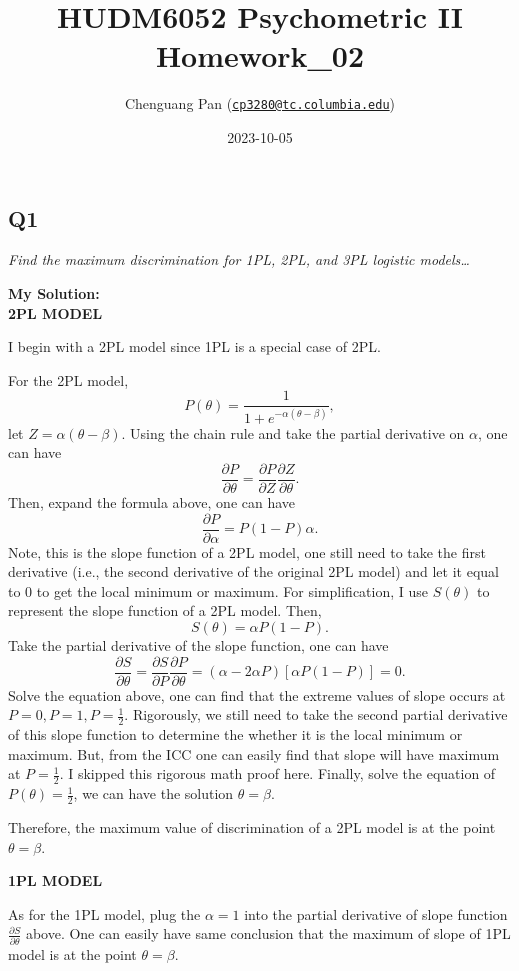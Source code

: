\documentclass[
]{article}
\title{HUDM6052 Psychometric II Homework\_02}
\author{Chenguang Pan
(\href{mailto:cp3280@tc.columbia.edu}{\nolinkurl{cp3280@tc.columbia.edu}})}
\date{2023-10-05}
\begin{document}
\maketitle

\setcounter{tocdepth}{4}
\tableofcontents

\hypertarget{q1}{%
\subsection{Q1}\label{q1}}

\emph{Find the maximum discrimination for 1PL, 2PL, and 3PL logistic
models\ldots{}}

\textbf{My Solution:}\\
\textbf{2PL MODEL}

I begin with a 2PL model since 1PL is a special case of 2PL.

For the 2PL model, \[P(\theta)=\frac{1}{1+e^{-\alpha(\theta-\beta)}},\]
let \(Z = \alpha(\theta-\beta)\). Using the chain rule and take the
partial derivative on \(\alpha\), one can have
\[\frac{\partial P}{\partial \theta}=\frac{\partial P}{\partial Z}\frac{\partial Z}{\partial \theta}. \]
Then, expand the formula above, one can have
\[\frac{\partial P}{\partial \alpha}=P(1-P)\alpha.\] Note, this is the
slope function of a 2PL model, one still need to take the first
derivative (i.e., the second derivative of the original 2PL model) and
let it equal to 0 to get the local minimum or maximum. For
simplification, I use \(S(\theta)\) to represent the slope function of a
2PL model. Then, \[S(\theta) = \alpha P(1-P).\] Take the partial
derivative of the slope function, one can have
\[\frac{\partial S}{\partial\theta} = \frac{\partial S}{\partial P}\frac{\partial P}{\partial\theta} = (\alpha-2\alpha P)[\alpha P(1-P)]=0.\]
Solve the equation above, one can find that the extreme values of slope
occurs at \(P=0, P=1, P=\frac{1}{2}\). Rigorously, we still need to take
the second partial derivative of this slope function to determine the
whether it is the local minimum or maximum. But, from the ICC one can
easily find that slope will have maximum at \(P=\frac{1}{2}\). I skipped
this rigorous math proof here. Finally, solve the equation of
\(P(\theta)=\frac{1}{2}\), we can have the solution \(\theta = \beta\).

Therefore, the maximum value of discrimination of a 2PL model is at the
point \(\theta =\beta.\)

\textbf{1PL MODEL}

As for the 1PL model, plug the \(\alpha = 1\) into the partial
derivative of slope function \(\frac{\partial S}{\partial\theta}\)
above. One can easily have same conclusion that the maximum of slope of
1PL model is at the point \(\theta = \beta\).
\end{document}
